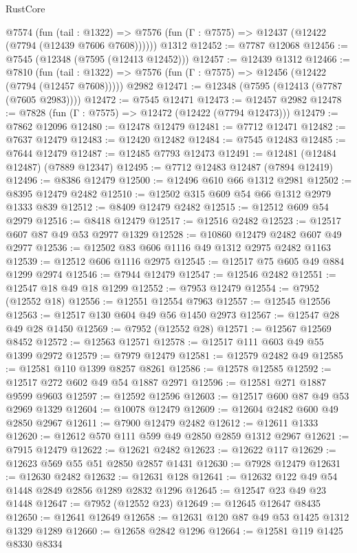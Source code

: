 \begin{lexlean}{RustCore}
\begin{coremodule}
    @7574
      (fun (tail : @1322) =>
      @7576 (fun (Γ : @7575) => @12437 (@12422 (@7794 (@12439 @7606 @7608))))))
    @1312
@12452 := @7787 @12068
@12456 := @7545 (@12348 (@7595 (@12413 @12452)))
@12457 := @12439 @1312
@12466 := @7810
    (fun (tail : @1322) => @7576 (fun (Γ : @7575) => @12456 (@12422 (@7794 (@12457 @7608)))))
    @2982
@12471 := @12348 (@7595 (@12413 (@7787 (@7605 @2983))))
@12472 := @7545 @12471
@12473 := @12457 @2982
@12478 := @7828 (fun (Γ : @7575) => @12472 (@12422 (@7794 @12473)))
@12479 := @7862 @12096
@12480 := @12478 @12479
@12481 := @7712 @12471
@12482 := @7637 @12479
@12483 := @12420 @12482
@12484 := @7545 @12483
@12485 := @7644 @12479
@12487 := @12485 @7793 @12473
@12491 := @12481 (@12484 @12487) (@7889 @12347)
@12495 := @7712 @12483 @12487 (@7894 @12419)
@12496 := @8386 @12479
@12500 := @12496 @610 @66 @1312 @2981
@12502 := @8395 @12479 @2482
@12510 := @12502 @315 @609 @54 @66 @1312 @2979 @1333 @839
@12512 := @8409 @12479 @2482
@12515 := @12512 @609 @54 @2979
@12516 := @8418 @12479
@12517 := @12516 @2482
@12523 := @12517 @607 @87 @49 @53 @2977 @1329
@12528 := @10860 @12479 @2482 @607 @49 @2977
@12536 := @12502 @83 @606 @1116 @49 @1312 @2975 @2482 @1163
@12539 := @12512 @606 @1116 @2975
@12545 := @12517 @75 @605 @49 @884 @1299 @2974
@12546 := @7944 @12479
@12547 := @12546 @2482
@12551 := @12547 @18 @49 @18 @1299
@12552 := @7953 @12479
@12554 := @7952 (@12552 @18)
@12556 := @12551 @12554 @7963
@12557 := @12545 @12556
@12563 := @12517 @130 @604 @49 @56 @1450 @2973
@12567 := @12547 @28 @49 @28 @1450
@12569 := @7952 (@12552 @28)
@12571 := @12567 @12569 @8452
@12572 := @12563 @12571
@12578 := @12517 @111 @603 @49 @55 @1399 @2972
@12579 := @7979 @12479
@12581 := @12579 @2482 @49
@12585 := @12581 @110 @1399 @8257 @8261
@12586 := @12578 @12585
@12592 := @12517 @272 @602 @49 @54 @1887 @2971
@12596 := @12581 @271 @1887 @9599 @9603
@12597 := @12592 @12596
@12603 := @12517 @600 @87 @49 @53 @2969 @1329
@12604 := @10078 @12479
@12609 := @12604 @2482 @600 @49 @2850 @2967
@12611 := @7900 @12479 @2482
@12612 := @12611 @1333
@12620 := @12612 @570 @111 @599 @49 @2850 @2859 @1312 @2967
@12621 := @7915 @12479
@12622 := @12621 @2482
@12623 := @12622 @117
@12629 := @12623 @569 @55 @51 @2850 @2857 @1431
@12630 := @7928 @12479
@12631 := @12630 @2482
@12632 := @12631 @128
@12641 := @12632 @122 @49 @54 @1448 @2849 @2856 @1289 @2832 @1296
@12645 := @12547 @23 @49 @23 @1448
@12647 := @7952 (@12552 @23)
@12649 := @12645 @12647 @8435
@12650 := @12641 @12649
@12658 := @12631 @120 @87 @49 @53 @1425 @1312 @1329 @1289
@12660 := @12658 @2842 @1296
@12664 := @12581 @119 @1425 @8330 @8334

\end{coremodule}
\end{lexlean}
